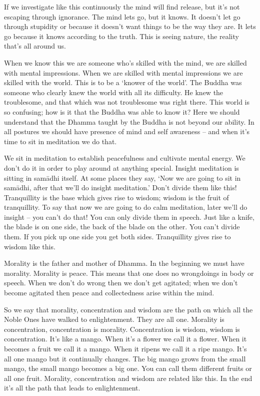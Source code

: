 If we investigate like this continuously the mind will find release, but it's not escaping through ignorance. The mind lets go, but it knows. It doesn't let go through stupidity or because it doesn't want things to be the way they are. It lets go because it knows according to the truth. This is seeing nature, the reality that's all around us. 

When we know this we are someone who's skilled with the mind, we are skilled with mental impressions. When we are skilled with mental impressions we are skilled with the world. This is to be a `knower of the world'. The Buddha was someone who clearly knew the world with all its difficulty. He knew the troublesome, and that which was not troublesome was right there. This world is so confusing; how is it that the Buddha was able to know it? Here we should understand that the Dhamma taught by the Buddha is not beyond our ability. In all postures we should have presence of mind and self awareness -- and when it's time to sit in meditation we do that. 

We sit in meditation to establish peacefulness and cultivate mental energy. We don't do it in order to play around at anything special. Insight meditation is sitting in sam\=adhi itself. At some places they say, `Now we are going to sit in sam\=adhi, after that we'll do insight meditation.' Don't divide them like this! Tranquillity is the base which gives rise to wisdom; wisdom is the fruit of tranquillity. To say that now we are going to do calm meditation, later we'll do insight -- you can't do that! You can only divide them in speech. Just like a knife, the blade is on one side, the back of the blade on the other. You can't divide them. If you pick up one side you get both sides. Tranquillity gives rise to wisdom like this. 

Morality is the father and mother of Dhamma. In the beginning we must have morality. Morality is peace. This means that one does no wrongdoings in body or speech. When we don't do wrong then we don't get agitated; when we don't become agitated then peace and collectedness arise within the mind. 

So we say that morality, concentration and wisdom are the path on which all the Noble Ones have walked to enlightenment. They are all one. Morality is concentration, concentration is morality. Concentration is wisdom, wisdom is concentration. It's like a mango. When it's a flower we call it a flower. When it becomes a fruit we call it a mango. When it ripens we call it a ripe mango. It's all one mango but it continually changes. The big mango grows from the small mango, the small mango becomes a big one. You can call them different fruits or all one fruit. Morality, concentration and wisdom are related like this. In the end it's all the path that leads to enlightenment. 

